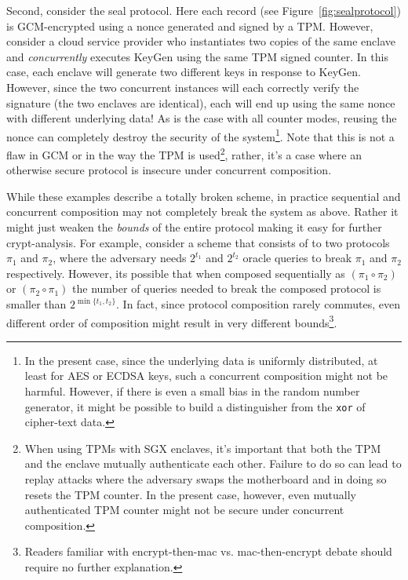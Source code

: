 \documentclass[letterpaper]{article}
\begin{document}
  Second, consider the seal protocol. Here each record (see
  Figure~\ref{fig:sealprotocol}) is GCM-encrypted using a nonce
  generated and signed by a TPM. However, consider a cloud service
  provider who instantiates two copies of the same enclave and
  \textit{concurrently} executes \textsf{KeyGen} using the same TPM
  signed counter. In this case, each enclave will generate two
  different keys in response to \textsf{KeyGen}. However, since the
  two concurrent instances will each correctly verify the signature
  (the two enclaves are identical), each will end up using the same
  nonce with different underlying data! As is the case with all
  counter modes, reusing the nonce can completely destroy the security
  of the system\footnote{In the present case, since the underlying
    data is uniformly distributed, at least for AES or ECDSA keys,
    such a concurrent composition might not be harmful. However, if
    there is even a small bias in the random number generator, it
    might be possible to build a distinguisher from the \texttt{xor}
    of cipher-text data.}. Note that this is not a flaw in GCM or in
  the way the TPM is used\footnote{When using TPMs with SGX enclaves,
    it's important that both the TPM and the enclave mutually
    authenticate each other. Failure to do so can lead to replay
    attacks where the adversary swaps the motherboard and in doing so
    resets the TPM counter. In the present case, however, even
    mutually authenticated TPM counter might not be secure under
    concurrent composition.}, rather, it's a case where an otherwise
  secure protocol is insecure under concurrent composition.

  While these examples describe a totally broken scheme, in practice
  sequential and concurrent composition may not completely break the
  system as above. Rather it might just weaken the \textit{bounds} of
  the entire protocol making it easy for further crypt-analysis. For
  example, consider a scheme that consists of to two protocols $\pi_1$
  and $\pi_2$, where the adversary needs $2^{t_1}$ and $2^{t_2}$
  oracle queries to break $\pi_1$ and $\pi_2$ respectively. However,
  its possible that when composed sequentially as $(\pi_1 \circ
  \pi_2)$ or $(\pi_2 \circ \pi_1)$ the number of queries needed to
  break the composed protocol is smaller than
  $2^{\min\{t_1,t_2\}}$. In fact, since protocol composition rarely
  commutes, even different order of composition might result in very
  different bounds\footnote{Readers familiar with
    \textsf{encrypt-then-mac} vs.  \textsf{mac-then-encrypt} debate
    should require no further explanation.}.
  
\end{document}
